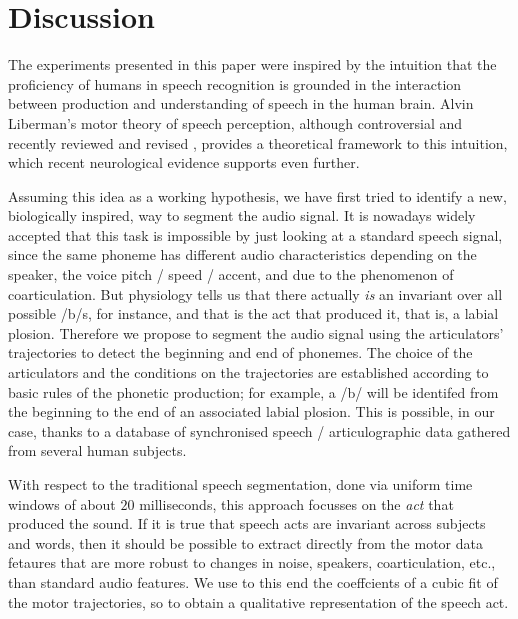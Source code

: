 \section{Discussion}
\label{sec:disc}

The experiments presented in this paper were inspired by the intuition that the
proficiency of humans in speech recognition is grounded in the interaction
between production and understanding of speech in the human brain. Alvin
Liberman's motor theory of speech perception, although controversial and
recently reviewed and revised \cite{liberman1,liberman2,galant,massaro},
provides a theoretical framework to this intuition, which recent neurological
evidence \cite{dausilio} supports even further.

Assuming this idea as a working hypothesis, we have first tried to identify
a new, biologically inspired, way to segment the audio signal. It is nowadays
widely accepted that this task is impossible by just looking at a standard
speech signal, since the same phoneme has different audio characteristics
depending on the speaker, the voice pitch / speed / accent, and due to the
phenomenon of coarticulation. But physiology tells us that there actually \emph{is} an invariant
over all possible /b/s, for instance, and that is the act that produced it,
that is, a labial plosion. Therefore we propose to segment the audio signal
using the articulators' trajectories to detect
the beginning and end of phonemes. The choice of the articulators and the
conditions on the trajectories are established according to basic rules of
the phonetic production; for example, a /b/ will be identifed from
the beginning to the end of an associated labial plosion. This is possible,
in our case, thanks to a database of synchronised speech / articulographic
data gathered from several human subjects.

With respect to the traditional speech segmentation, done via uniform time
windows of about $20$ milliseconds, this approach focusses on the \emph{act}
that produced the sound. If it is true that speech acts are invariant across
subjects and words, then it should be possible to extract directly from the motor data
fetaures that are more robust to changes in noise, speakers,
coarticulation, etc., than standard
audio features. We use to this end the coeffcients of a cubic fit of the
motor trajectories, so to obtain a qualitative representation of the speech
act.


